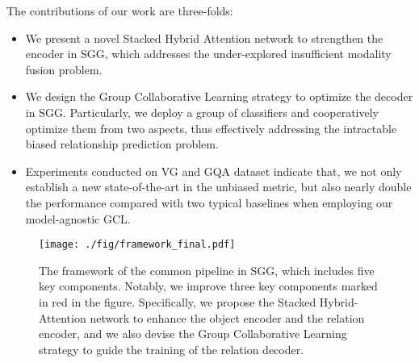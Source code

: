 \documentclass[10pt,twocolumn,letterpaper]{article}
\begin{document}
The contributions of our work are three-folds:

\vspace{-0.2cm}
\begin{itemize}
\setlength{\itemsep}{0pt}
\setlength{\parsep}{0pt}
\setlength{\parskip}{0pt}

	\item We present a novel Stacked Hybrid Attention network to strengthen the encoder in SGG, which addresses the under-explored insufficient modality fusion problem.
	
	\item We design the Group Collaborative Learning strategy to optimize the decoder in SGG. Particularly, we deploy a group of classifiers and cooperatively optimize them from two aspects, thus effectively addressing the intractable biased relationship prediction problem.
	
	\item Experiments conducted on VG and GQA dataset indicate that, we not only establish a new state-of-the-art in the unbiased metric, but also nearly 
	double the performance compared with two typical baselines when employing our model-agnostic GCL.

\end{itemize}
\vspace{-0.2cm}


\begin{figure*}[t]
	\begin{center}
		\texttt{[image: ./fig/framework\_final.pdf]}
	\end{center}
	\vspace{-0.4cm}
	\caption{The framework of the common pipeline in SGG, which includes five key components. Notably, we improve three key components marked in red in the figure. Specifically, we propose the Stacked Hybrid-Attention network to enhance the object encoder and the relation encoder, and we also devise the Group Collaborative Learning strategy to guide the training of the relation decoder.}
	
	\vspace{-0.4cm}
	\label{framework}
\end{figure*}
\end{document}
